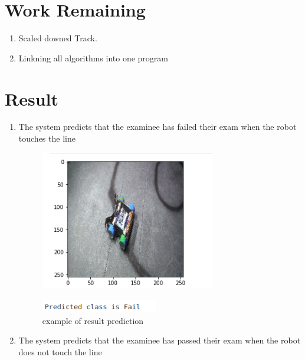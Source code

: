 \section{Work Remaining}
\begin{enumerate}
\item Scaled downed Track.
\item Linkning all algorithms into one program
\end{enumerate}
   
\section{Result}
\begin{enumerate}
\item The system predicts that the examinee has failed their exam when the robot touches the line
\begin{figure}[H] %
\begin{center}
	\includegraphics[width = 3in]{images/linet.png}
	\label{figSample1} %
\end{center}
\end{figure}
\begin{figure}[H] %
\begin{center}
	\includegraphics[width = 2in]{images/linetr.png}
	\caption{example of result prediction} %
	\label{figSample1} %
\end{center}
\end{figure}
\item The system predicts that the examinee has passed their exam when the robot does not touch the line

\end{enumerate}
